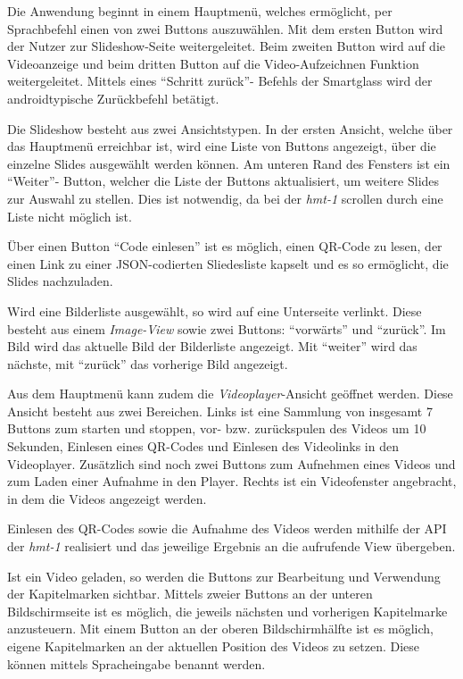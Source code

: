 Die Anwendung beginnt in einem Hauptmenü, welches ermöglicht, per Sprachbefehl einen von zwei Buttons auszuwählen. Mit dem ersten Button wird der Nutzer zur Slideshow-Seite weitergeleitet. Beim zweiten Button wird auf die Videoanzeige und beim dritten Button auf die Video-Aufzeichnen Funktion weitergeleitet. Mittels eines \enquote{Schritt zurück}- Befehls der Smartglass wird der androidtypische Zurückbefehl betätigt.

Die Slideshow besteht aus zwei Ansichtstypen. In der ersten Ansicht, welche über das Hauptmenü erreichbar ist, wird eine Liste von Buttons angezeigt, über die einzelne Slides ausgewählt werden können. Am unteren Rand des Fensters ist ein \enquote{Weiter}- Button, welcher die Liste der Buttons aktualisiert, um weitere Slides zur Auswahl zu stellen. Dies ist notwendig, da bei der \emph{hmt-1} scrollen durch eine Liste nicht möglich ist.

Über einen Button \enquote{Code einlesen} ist es möglich, einen QR-Code zu lesen, der einen Link zu einer JSON-codierten Sliedesliste kapselt und es so ermöglicht, die Slides nachzuladen.

Wird eine Bilderliste ausgewählt, so wird auf eine Unterseite verlinkt. Diese besteht aus einem \emph{Image-View} sowie zwei Buttons: \enquote{vorwärts} und \enquote{zurück}. Im Bild wird das aktuelle Bild der Bilderliste angezeigt. Mit \enquote{weiter} wird das nächste, mit \enquote{zurück} das vorherige Bild angezeigt.

Aus dem Hauptmenü kann zudem die \emph{Videoplayer}-Ansicht geöffnet werden. Diese Ansicht besteht aus zwei Bereichen. Links ist eine Sammlung von insgesamt 7 Buttons zum starten und stoppen, vor- bzw. zurückspulen des Videos um 10 Sekunden, Einlesen eines QR-Codes und Einlesen des Videolinks in den Videoplayer. Zusätzlich sind noch zwei Buttons zum Aufnehmen eines Videos und zum Laden einer Aufnahme in den Player. Rechts ist ein Videofenster angebracht, in dem die Videos angezeigt werden.

Einlesen des QR-Codes sowie die Aufnahme des Videos werden mithilfe der API der \emph{hmt-1} realisiert und das jeweilige Ergebnis an die aufrufende View übergeben. 

Ist ein Video geladen, so werden die Buttons zur Bearbeitung und Verwendung der Kapitelmarken sichtbar. Mittels zweier Buttons an der unteren Bildschirmseite ist es möglich, die jeweils nächsten und vorherigen Kapitelmarke anzusteuern. Mit einem Button an der oberen Bildschirmhälfte ist es möglich, eigene Kapitelmarken an der aktuellen Position des Videos zu setzen. Diese können mittels Spracheingabe benannt werden.

